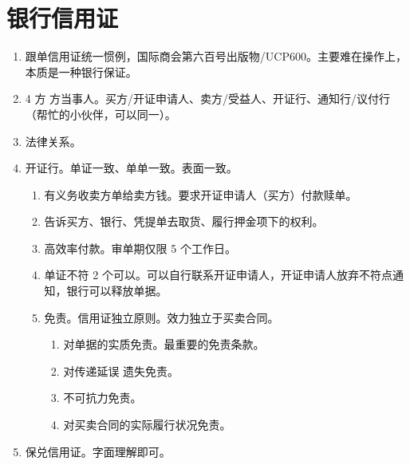 \section{银行信用证}
\begin{enumerate}
  \item 跟单信用证统一惯例，国际商会第六百号出版物/UCP600。主要难在操作上，本质是一种银行保证。
  \item 4 方  方当事人。买方/开证申请人、卖方/受益人、开证行、通知行/议付行（帮忙的小伙伴，可以同一）。
  \item 法律关系。
  \item 开证行。单证一致、单单一致。表面一致。
        \begin{enumerate}
          \item 有义务收卖方单给卖方钱。要求开证申请人（买方）付款赎单。
          \item 告诉买方、银行、凭提单去取货、履行押金项下的权利。
          \item 高效率付款。审单期仅限 5 个工作日。
          \item 单证不符 2 个可以。可以自行联系开证申请人，开证申请人放弃不符点通知，银行可以释放单据。
          \item 免责。信用证独立原则。效力独立于买卖合同。
                \begin{enumerate}
                  \item 对单据的实质免责。最重要的免责条款。
                  \item 对传递延误 \hz 遗失免责。
                  \item 不可抗力免责。
                  \item 对买卖合同的实际履行状况免责。
                \end{enumerate}
        \end{enumerate}
  \item 保兑信用证。字面理解即可。
        \begin{enumerate}

\end{enumerate}
\end{enumerate}
